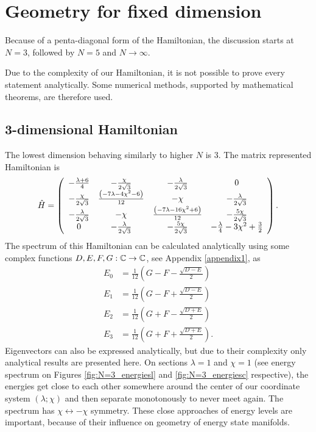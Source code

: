 \section{Geometry for fixed dimension}
Because of a penta-diagonal form of the Hamiltonian, the discussion starts at $N=3$, followed by $N=5$ and $N\rightarrow\infty$.

Due to the complexity of our Hamiltonian, it is not possible to prove every statement analytically. Some numerical methods, supported by mathematical theorems, are therefore used.



\subsection{3-dimensional Hamiltonian}
The lowest dimension behaving similarly to higher $N$ is 3. The matrix represented Hamiltonian is
\begin{equation}
    \hat{H}=\left(
        \begin{array}{cccc}
         -\frac{ \lambda +6}{4} & -\frac{\chi }{2 \sqrt{3}} & -\frac{\lambda }{2 \sqrt{3}} & 0 \\
         -\frac{\chi }{2 \sqrt{3}} & \frac{ \left(-7 \lambda -4 \chi ^2-6\right)}{12} & -\chi  & -\frac{\lambda }{2 \sqrt{3}} \\
         -\frac{\lambda }{2 \sqrt{3}} & -\chi  & \frac{ \left(-7 \lambda -16 \chi ^2+6\right)}{12} & -\frac{5 \chi }{2 \sqrt{3}} \\
         0 & -\frac{\lambda }{2 \sqrt{3}} & -\frac{5 \chi }{2 \sqrt{3}} & -\frac{\lambda }{4}-3 \chi ^2+\frac{3}{2} \\
        \end{array}
        \right).
\end{equation}
The spectrum of this Hamiltonian can be calculated analytically using some complex functions $D, E, F, G:\mathbb{C}\rightarrow \mathbb{C}$, see Appendix \ref{appendix1}, as
\begin{align}
        E_0 &= \frac{1}{12} \left(G-F-\frac{\sqrt{D-E}}{2}\right)
        \label{eq:N=3_en0}\\
        E_1 &= \frac{1}{12}  \left(G-F+\frac{\sqrt{D-E}}{2}\right)
        \label{eq:N=3_en1}\\
        E_2 &= \frac{1}{12} \left(G+F-\frac{\sqrt{D+E}}{2}\right)
        \label{eq:N=3_en2}\\
        E_3 &= \frac{1}{12}  \left(G+F+\frac{\sqrt{D+E}}{2}\right).
        \label{eq:N=3_en3}
\end{align}
Eigenvectors can also be expressed analytically, but due to their complexity only analytical results are presented here. On sections $\lambda=1$ and $\chi=1$ (see energy spectrum on Figures \ref{fig:N=3_energiesl} and \ref{fig:N=3_energiesc} respective), the energies get close to each other somewhere around the center of our coordinate system $(\lambda;\chi)$ and then separate monotonously to never meet again. The spectrum has $\chi\leftrightarrow -\chi$ symmetry. These close approaches of energy levels are important, because of their influence on geometry of energy state manifolds.

